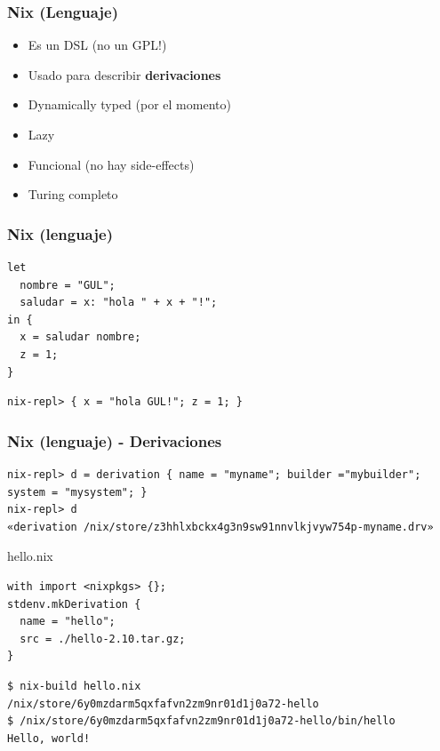 \documentclass[aspectratio=43]{beamer}
\begin{document}
\begin{frame}
    \frametitle{Nix (Lenguaje)}
    \begin{itemize}
    \item Es un DSL (no un GPL!)
    \item Usado para describir \textbf{derivaciones}
    \item Dynamically typed (por el momento)
    \item Lazy
    \item Funcional (no hay side-effects)
    \item Turing completo
    \end{itemize}
\end{frame}

\begin{frame}[fragile]
    \frametitle{Nix (lenguaje)}
    \begin{block}{}
        \begin{verbatim} 
let
  nombre = "GUL";
  saludar = x: "hola " + x + "!";
in {
  x = saludar nombre;
  z = 1;
}
        \end{verbatim}
    \end{block}
    \begin{block}{}
    \begin{verbatim}
nix-repl> { x = "hola GUL!"; z = 1; }
    \end{verbatim}
    \end{block}
\end{frame}

\begin{frame}[fragile]
    \frametitle{Nix (lenguaje) - Derivaciones}
    \begin{block}{}
    \fontsize{10}{12}\begin{verbatim}
nix-repl> d = derivation { name = "myname"; builder ="mybuilder";
system = "mysystem"; }
nix-repl> d
«derivation /nix/store/z3hhlxbckx4g3n9sw91nnvlkjvyw754p-myname.drv»
    \end{verbatim}
    \end{block}
\begin{block}{hello.nix}
\begin{verbatim}
with import <nixpkgs> {};
stdenv.mkDerivation {
  name = "hello";
  src = ./hello-2.10.tar.gz;
}
\end{verbatim}
\end{block}
\begin{block}{}
\fontsize{10}{12}\begin{verbatim}
$ nix-build hello.nix
/nix/store/6y0mzdarm5qxfafvn2zm9nr01d1j0a72-hello
$ /nix/store/6y0mzdarm5qxfafvn2zm9nr01d1j0a72-hello/bin/hello
Hello, world!
\end{verbatim}
\end{block}
\end{frame}
\end{document}
